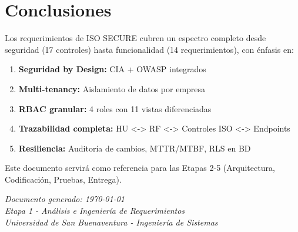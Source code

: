 \documentclass[12pt,a4paper,oneside]{article}
\begin{document}
\section{Conclusiones}

Los requerimientos de ISO SECURE cubren un espectro completo desde seguridad (17 controles) hasta funcionalidad (14 requerimientos), con énfasis en:
\begin{enumerate}
  \item \textbf{Seguridad by Design:} CIA + OWASP integrados
  \item \textbf{Multi-tenancy:} Aislamiento de datos por empresa
  \item \textbf{RBAC granular:} 4 roles con 11 vistas diferenciadas
  \item \textbf{Trazabilidad completa:} HU <-> RF <-> Controles ISO <-> Endpoints
  \item \textbf{Resiliencia:} Auditoría de cambios, MTTR/MTBF, RLS en BD
\end{enumerate}

Este documento servirá como referencia para las Etapas 2-5 (Arquitectura, Codificación, Pruebas, Entrega).

\vfill

\begin{center}
  \textit{Documento generado: \today}\\
  \textit{Etapa 1 - Análisis e Ingeniería de Requerimientos}\\
  \textit{Universidad de San Buenaventura - Ingeniería de Sistemas}
\end{center}
\end{document}

